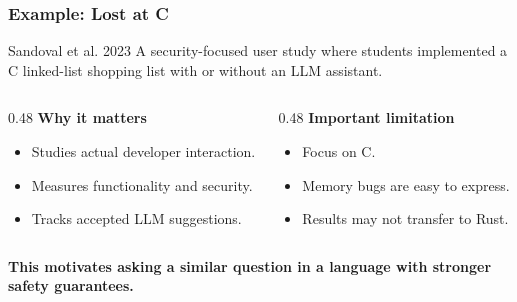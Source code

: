 \begin{frame}
\frametitle{Example: Lost at C}

\begin{block}{Sandoval et al. 2023}
A security-focused user study where students implemented a C linked-list shopping list with or without an LLM assistant.
\end{block}

\medskip

\begin{columns}[T]
\begin{column}{0.48\textwidth}
\textbf{Why it matters}
\begin{itemize}
    \item Studies actual developer interaction.
    \item Measures functionality and security.
    \item Tracks accepted LLM suggestions.
\end{itemize}
\end{column}

\begin{column}{0.48\textwidth}
\textbf{Important limitation}
\begin{itemize}
    \item Focus on C.
    \item Memory bugs are easy to express.
    \item Results may not transfer to Rust.
\end{itemize}
\end{column}
\end{columns}

\bigskip
\centering
\textbf{This motivates asking a similar question in a language with stronger safety guarantees.}

\end{frame}


